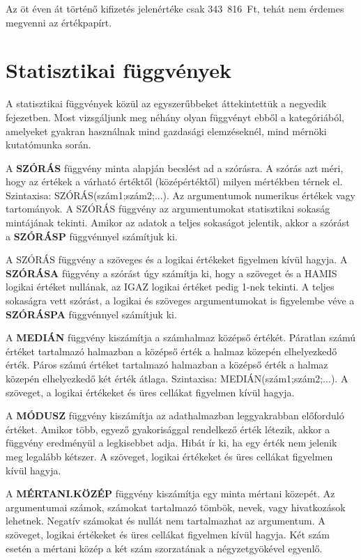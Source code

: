 Az öt éven át történő kifizetés jelenértéke csak
343~816~Ft, tehát nem érdemes megvenni az értékpapírt.


\section{Statisztikai függvények}

A statisztikai függvények közül az egyszerűbbeket
áttekintettük a negyedik fejezetben. Most vizsgáljunk meg
néhány olyan függvényt ebből a kategóriából,
amelyeket gyakran használnak mind gazdasági elemzéseknél, mind
mérnöki kutatómunka során.

A \textbf{SZÓRÁS} függvény minta alapján becslést ad a
szórásra. A szórás azt méri, hogy az értékek a
várható értéktől (középértéktől) milyen
mértékben térnek el. Szintaxisa: SZÓRÁS(szám1;szám2;...). Az
argumentumok numerikus értékek vagy tartományok. A SZÓRÁS
függvény az argumentumokat statisztikai sokaság mintájának
tekinti. Amikor az adatok a teljes sokaságot jelentik, akkor a
szórást a \textbf{SZÓRÁSP} függvénnyel számítjuk ki. 

A SZÓRÁS függvény a szöveges és a logikai értékeket
figyelmen kívül hagyja. A \textbf{SZÓRÁSA} függvény a
szórást úgy számítja ki, hogy a szöveget és a HAMIS
logikai értéket nullának, az IGAZ logikai értéket pedig 1-nek
tekinti. A teljes sokaságra vett szórást, a logikai és
szöveges argumentumokat is figyelembe véve a \textbf{SZÓRÁSPA}
függvénnyel számítjuk ki.

A \textbf{MEDIÁN} függvény kiszámítja a számhalmaz
középső értékét. Páratlan számú értéket
tartalmazó halmazban a középső érték a halmaz közepén
elhelyezkedő érték. Páros számú értéket tartalmazó
halmazban a középső érték a halmaz közepén
elhelyezkedő két érték átlaga. Szintaxisa:
MEDIÁN(szám1;szám2;...). A szöveget, a logikai értékeket és
üres cellákat figyelmen kívül hagyja.

A \textbf{MÓDUSZ} függvény kiszámítja az adathalmazban
leggyakrabban előforduló értéket. Amikor több, egyező
gyakorisággal rendelkező érték létezik, akkor a
függvény eredményül a legkisebbet adja. Hibát ír ki, ha egy
érték nem jelenik meg legalább kétszer. A szöveget, logikai
értékeket és üres cellákat figyelmen kívül hagyja.

A \textbf{MÉRTANI.KÖZÉP} függvény kiszámítja egy minta mértani
közepét. Az argumentumai számok, számokat tartalmazó
tömbök, nevek, vagy hivatkozások lehetnek. Negatív számokat
és nullát nem tartalmazhat az argumentum. A szöveget, logikai
értékeket és üres cellákat figyelmen kívül hagyja. Két
szám esetén a mértani közép a két szám szorzatának a
négyzetgyökével egyenlő.

